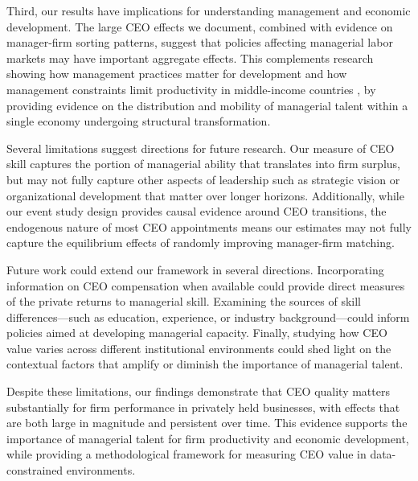 \documentclass[11pt,a4paper]{article}
\begin{document}
Third, our results have implications for understanding management and economic development. The large CEO effects we document, combined with evidence on manager-firm sorting patterns, suggest that policies affecting managerial labor markets may have important aggregate effects. This complements research showing how management practices matter for development \citep{bloom2013does} and how management constraints limit productivity in middle-income countries \citep{dahlstrand2025ceo}, by providing evidence on the distribution and mobility of managerial talent within a single economy undergoing structural transformation.

Several limitations suggest directions for future research. Our measure of CEO skill captures the portion of managerial ability that translates into firm surplus, but may not fully capture other aspects of leadership such as strategic vision or organizational development that matter over longer horizons. Additionally, while our event study design provides causal evidence around CEO transitions, the endogenous nature of most CEO appointments means our estimates may not fully capture the equilibrium effects of randomly improving manager-firm matching.

Future work could extend our framework in several directions. Incorporating information on CEO compensation when available could provide direct measures of the private returns to managerial skill. Examining the sources of skill differences—such as education, experience, or industry background—could inform policies aimed at developing managerial capacity. Finally, studying how CEO value varies across different institutional environments could shed light on the contextual factors that amplify or diminish the importance of managerial talent.

Despite these limitations, our findings demonstrate that CEO quality matters substantially for firm performance in privately held businesses, with effects that are both large in magnitude and persistent over time. This evidence supports the importance of managerial talent for firm productivity and economic development, while providing a methodological framework for measuring CEO value in data-constrained environments.
\end{document}
